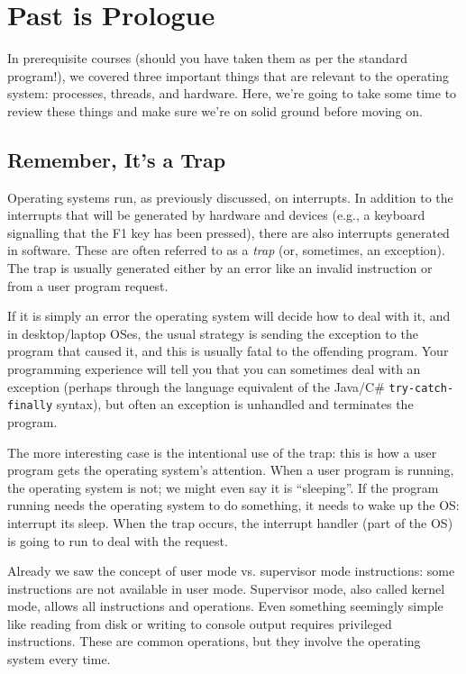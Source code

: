 




\section*{Past is Prologue}
In prerequisite courses (should you have taken them as per the standard program!), we covered three important things that are relevant to the operating system: processes, threads, and hardware. Here, we're going to take some time to review these things and make sure we're on solid ground before moving on. 

\subsection*{Remember, It's a Trap}
Operating systems run, as previously discussed, on interrupts. In addition to the interrupts that will be generated by hardware and devices (e.g., a keyboard signalling that the F1 key has been pressed), there are also interrupts generated in software. These are often referred to as a \textit{trap} (or, sometimes, an exception). The trap is usually generated either by an error like an invalid instruction or from a user program request.

If it is simply an error the operating system will decide how to deal with it, and in desktop/laptop OSes, the usual strategy is sending the exception to the program that caused it, and this is usually fatal to the offending program. Your programming experience will tell you that you can sometimes deal with an exception (perhaps through the language equivalent of the Java/C\# \texttt{try-catch-finally} syntax), but often an exception is unhandled and terminates the program.

The more interesting case is the intentional use of the trap: this is how a user program gets the operating system's attention. When a user program is running, the operating system is not; we might even say it is ``sleeping''. If the program running needs the operating system to do something, it needs to wake up the OS: interrupt its sleep. When the trap occurs, the interrupt handler (part of the OS) is going to run to deal with the request.

Already we saw the concept of user mode vs. supervisor mode instructions: some instructions are not available in user mode. Supervisor mode, also called kernel mode, allows all instructions and operations. Even something seemingly simple like reading from disk or writing to console output requires privileged instructions. These are common operations, but they involve the operating system every time.

